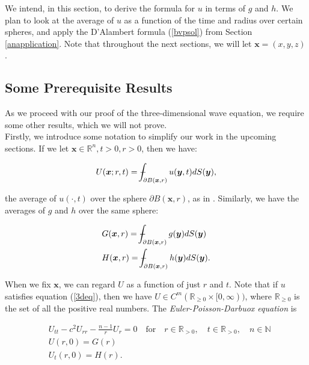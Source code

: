 \documentclass[a4paper, 12pt]{article}
\def\Xint#1{\mathchoice
{\XXint\displaystyle\textstyle{#1}}%
{\XXint\textstyle\scriptstyle{#1}}%
{\XXint\scriptstyle\scriptscriptstyle{#1}}%
{\XXint\scriptscriptstyle\scriptscriptstyle{#1}}%
\!\int}
\def\XXint#1#2#3{{\setbox0=\hbox{$#1{#2#3}{\int}$ }
\vcenter{\hbox{$#2#3$ }}\kern-.6\wd0}}
\def\dashint{\Xint-}
\numberwithin{equation}{section}
\begin{document}
We intend, in this section, to derive the formula for $u$ in terms of $g$ and $h$. We plan to look at the average of $u$ as a
function of the time and radius over certain spheres, and apply the D'Alambert formula (\ref{bvpsol}) from Section \ref{anapplication}.
Note that throughout the next sections, we will let $\boldsymbol{x}=(x,y,z)$.

\subsection{Some Prerequisite Results} \label{prereq}
As we proceed with our proof of the three-dimensional wave equation, we require some other results, which we will not prove.
\\

Firstly, we introduce some notation to simplify our work in the upcoming sections. If we let $\boldsymbol{x}\in \mathbb{R}^n, t>0, r>0$, then we have:

\begin{equation} \label{averageU}
    U(\boldsymbol{x};r,t)=\dashint_{\partial B(\boldsymbol{x},r)}u(\boldsymbol{y},t)dS(\boldsymbol{y}),
\end{equation}

the average of $u(\cdot,t)$ over the sphere $\partial B(\boldsymbol{x},r)$, as in \cite{Ev}. Similarly, we have the averages of $g$ and $h$ over the same sphere:

\begin{equation} \label{averageGH}
    \begin{aligned}
        &G(\boldsymbol{x},r)=\dashint_{\partial B(\boldsymbol{x},r)}g(\boldsymbol{y})dS(\boldsymbol{y})\\
        &H(\boldsymbol{x},r)=\dashint_{\partial B(\boldsymbol{x},r)}h(\boldsymbol{y})dS(\boldsymbol{y}).
    \end{aligned}
\end{equation}

When we fix $\boldsymbol{x}$, we can regard $U$ as a function of just $r$ and $t$. Note that if $u$ satisfies equation
(\ref{3deq}), then we have $U \in C^m(\mathbb{R}_{\ge 0}\times[0,\infty))$, where $\mathbb{R}_{\ge 0}$ is the set of all the positive real numbers. The \emph{Euler-Poisson-Darbuox equation} is

\begin{equation} \label{EPDeq}
    \begin{aligned}
        &U_{tt}-c^2U_{rr}-\frac{n-1}{r}U_r=0 \quad \textrm {for} \quad r \in \mathbb{R}_{>0}, \quad t \in \mathbb{R}_{>0}, \quad n \in \mathbb{N}\\
        &U(r, 0)=G(r)\\
        &U_t(r,0)=H(r).
    \end{aligned}
\end{equation}
\end{document}
